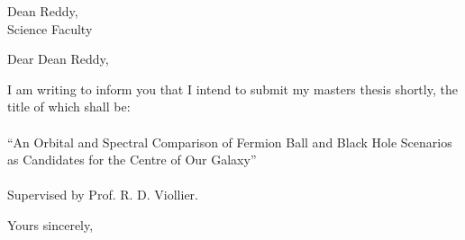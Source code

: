 \documentclass[12pt,a4paper]{letter}
\begin{document}
\begin{letter}{Dean Reddy,\\Science Faculty}
\opening{Dear Dean Reddy,}
\signature{Sam Halliday \\
HLLSAM001 \\
sam@neutrino.phy.uct.ac.za \\
EXT: 3344}
I am writing to inform you that I intend to submit my masters thesis shortly, the title of which shall be:\\ \\
``An Orbital and Spectral Comparison of Fermion Ball and Black Hole Scenarios as Candidates for the Centre of Our Galaxy''\\ \\
Supervised by Prof. R. D. Viollier.\\

\closing{Yours sincerely,}

\end{letter}
\end{document}

